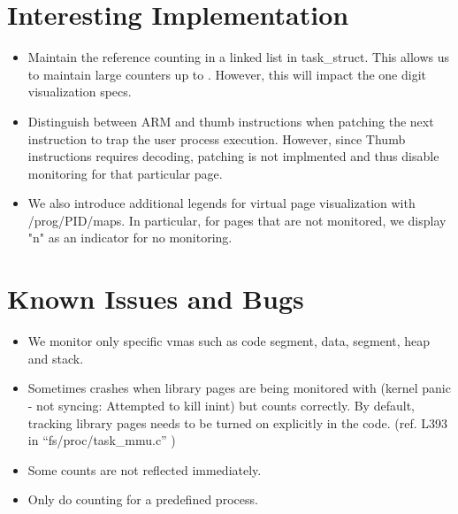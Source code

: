\documentclass[11pt]{article}
\theoremstyle{plain} \numberwithin{equation}{section}
\theoremstyle{definition}
\newcounter{list}
\begin{document}
\section{Interesting Implementation}
\vspace{-0.1in}
\begin{itemize}
	\item Maintain the reference counting in a linked list in task\_struct. This 
allows us to maintain large counters up to . However, this will impact the one digit 
visualization specs. 
	\item Distinguish between ARM and thumb instructions when patching the next 
instruction to trap the user process execution. However, since Thumb instructions 
requires decoding, patching is not implmented and thus disable monitoring for that 
particular page. 
    \item We also introduce additional legends for virtual page visualization with 
/prog/PID/maps. In particular, for pages that are not monitored, we display "n" as an 
indicator for no monitoring. 
\end{itemize}

\section{Known Issues and Bugs}
\vspace{-0.1in}
\begin{itemize}
	\item We monitor only specific vmas such as code segment, data, segment, heap and 
stack. 
	\item Sometimes crashes when library pages are being monitored with (kernel panic 
- not syncing: Attempted to kill inint) but counts correctly. By default, tracking 
library pages needs to be turned on explicitly in the code. (ref. L393 in 
``fs/proc/task\_mmu.c'' )
	\item Some counts are not reflected immediately. 
    \item Only do counting for a predefined process. 
    
\end{itemize}
\end{document}
